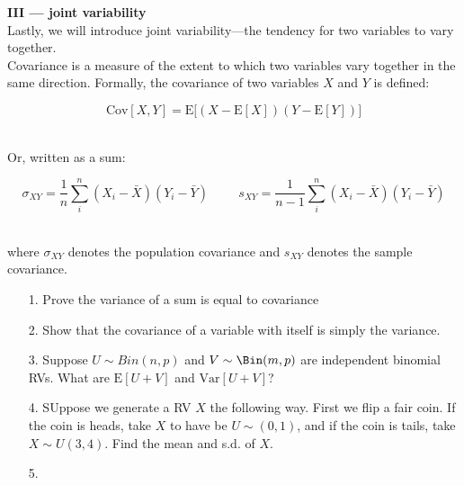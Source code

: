 \documentclass[10pt]{extarticle}
\newcommand{\E}{\text{E}}
\newcommand{\Var}{\text{Var}}
\newcommand{\Cov}{\text{Cov}}
\begin{document}
\hfill 






{\Large \bf III --- joint variability} \\ 

Lastly, we will introduce joint variability---the tendency for two variables to vary together. \\  

Covariance is a measure of  the extent to which two variables vary together in the same direction. Formally, the covariance of two variables $X$ and $Y$ is defined:

$$\Cov[X,Y] = \E \big[ (X - \E[X]) (Y - \E[Y] )\big]$$ \ 

Or, written as a sum:

$$\sigma_{XY} = \frac 1n \sum_i^n (X_i - \bar X)(Y_i - \bar Y) \hspace{1cm} s_{XY} = \frac{1}{n-1} \sum_i^n (X_i - \bar X)(Y_i - \bar Y)$$ \ 

where $\sigma_{XY}$ denotes the population covariance and $s_{XY}$ denotes the sample covariance.  

\hfill 

\begin{itemize}

	\item[1.] Prove the variance of a sum is  equal to covariance \\  

	\item[2.] Show that the covariance of a variable with  itself is simply the variance. \\ 

	\item[3.] Suppose $U \sim Bin(n,p)$ and $V \sim \Bin(m,p)$ are independent binomial RVs. What are $\E[U+V]$ and $\Var[U+V]$? \\

	\item[4.] SUppose we generate a RV $X$ the following way. First we flip a fair coin. If the coin is heads, take $X$ to have be $U \sim (0,1)$, and if the coin is tails, take $X \sim U(3,4)$. Find the mean and s.d. of $X$. \\ 

	\item[5.] 

\end{itemize} 
\end{document}
